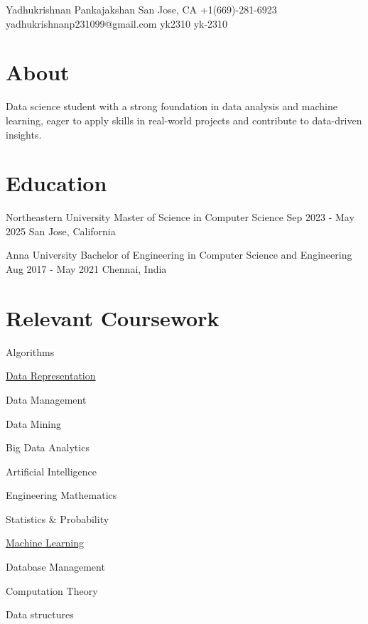 \documentclass[letterpaper]{resume_config}
\begin{document}
\Header
    {Yadhukrishnan Pankajakshan} %
    {San Jose, CA} %
    {+1(669)-281-6923} %
    {yadhukrishnanp231099@gmail.com} %
    {yk2310} %
    {yk-2310} %

\section{About}
{
    Data science student with a strong foundation in data analysis and machine learning, eager to apply skills in real-world projects and contribute to data-driven insights.
}


\section{Education}

\EducationExperience
    {Northeastern University} %
    {Master of Science in Computer Science} %
    {Sep 2023 - May 2025} %
    {San Jose, California} %

\EducationExperience
    {Anna University} %
    {Bachelor of Engineering in Computer Science and Engineering} %
    {Aug 2017 - May 2021} %
    {Chennai, India} %
\vspace{-5pt}


\section{Relevant Coursework}
\begin{SkillsList}{
    \item{Algorithms}
    \item{\href{https://coursera.org/share/60e08a9390dc0ed469da34213f7a9d9c}{Data Representation}}
    \item{Data Management}
    \item{Data Mining}
    \item{Big Data Analytics}
    \item{Artificial Intelligence}
    \item{Engineering Mathematics}
    \item{Statistics \& Probability}
    \item{\href{https://coursera.org/share/b76edb1c16934e4a06f3553c2c4e67b8}{Machine Learning}}
    \item{Database Management}
    \item{Computation Theory}
    \item{Data structures}
}
\end{SkillsList}
\end{document}
